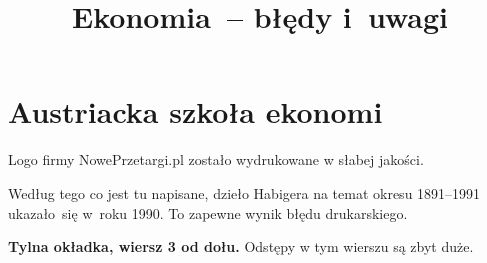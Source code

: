 \documentclass[a4paper,11pt]{article}
\title{Ekonomia~-- błędy i~uwagi}
\begin{document}





\maketitle %





\section{Austriacka szkoła ekonomi}

\vspace{\spaceTwo}







 Logo firmy NowePrzetargi.pl zostało wydrukowane w słabej jakości.

\vspace{\spaceFour}



 Według tego co jest tu napisane, dzieło Habigera na
temat okresu 1891--1991 ukazało~się w~roku 1990. To zapewne wynik błędu
drukarskiego.

\vspace{\spaceFour}



\textbf{Tylna okładka, wiersz 3 od dołu.} Odstępy w tym wierszu są
zbyt duże.








\end{document}
